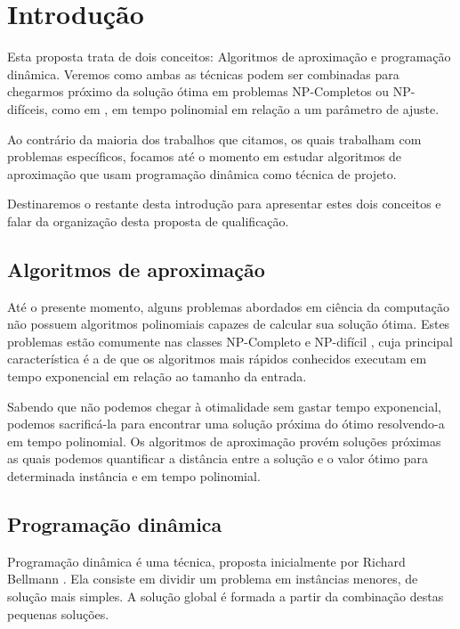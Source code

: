 \chapter{Introdu\c{c}\~ao}
\label{chap:Introducao}

Esta proposta trata de dois conceitos: Algoritmos de aproximação e programação dinâmica. Veremos como ambas as técnicas podem ser combinadas para chegarmos próximo da solução ótima em problemas NP-Completos ou NP-difíceis, como em \cite{arora1998polynomial}, em tempo polinomial em relação a um parâmetro de ajuste.

Ao contrário da maioria dos trabalhos que citamos, os quais trabalham com problemas específicos, focamos até o momento em estudar algoritmos de aproximação que usam programação dinâmica como técnica de projeto.

Destinaremos o restante desta introdução para apresentar estes dois conceitos e falar da organização desta proposta de qualificação.

\section{Algoritmos de aproximação}

Até o presente momento, alguns problemas abordados em ciência da computação não possuem algoritmos polinomiais capazes de calcular sua solução ótima. Estes problemas estão comumente nas classes NP-Completo e NP-difícil \cite{Fortnow:2009:SPV:1562164.1562186}, cuja principal característica é a de que os algoritmos mais rápidos conhecidos executam em tempo exponencial em relação ao tamanho da entrada.

Sabendo que não podemos chegar à otimalidade sem gastar tempo exponencial, podemos sacrificá-la para encontrar uma solução próxima do ótimo resolvendo-a em tempo polinomial. Os algoritmos de aproximação provém soluções próximas as quais podemos quantificar a distância entre a solução e o valor ótimo para determinada instância e em tempo polinomial.

\section{Programação dinâmica}

Programação dinâmica é uma técnica, proposta inicialmente por Richard Bellmann \cite{bellman1952theory}. Ela consiste em dividir um problema em instâncias menores, de solução mais simples. A solução global é formada a partir da combinação destas pequenas soluções.

